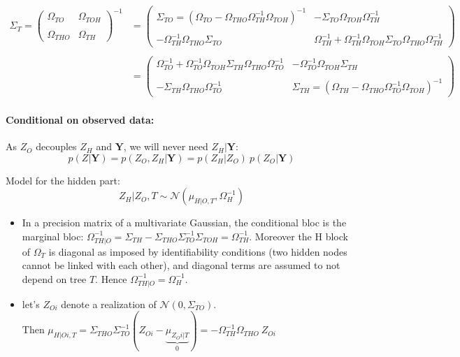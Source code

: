 \documentclass[11pt,a4paper]{article}
\newcommand{\Ybf}{\boldsymbol{Y}}
\begin{document}
\begin{align*}
 \Sigma_T=
  \left( {\begin{array}{cc}
  \Omega_{TO} &  \Omega_{TOH}\\\\
  \Omega_{THO} & \Omega_{TH}
  \end{array} } \right)^{-1} &=
  \left( {\begin{array}{cc}
  \Sigma_{TO} =( \Omega_{TO} - \Omega_{THO}\Omega_{TH}^{-1}\Omega_{TOH})^{-1} &  - \Sigma_{TO} \Omega_{TOH}\Omega_{TH}^{-1}\\\\
 -\Omega_{TH}^{-1}\Omega_{THO}\Sigma_{TO} & \Omega_{TH}^{-1}+\Omega_{TH}^{-1}\Omega_{TOH}\Sigma_{TO}\Omega_{THO}\Omega_{TH}^{-1}
  \end{array} } \right)\\\\
  &=   \left( {\begin{array}{cc}
   \Omega_{TO}^{-1}+\Omega_{TO}^{-1}\Omega_{TOH}\Sigma_{TH}\Omega_{THO}\Omega_{TO}^{-1} & -\Omega_{TO}^{-1}\Omega_{TOH}\Sigma_{TH} \\\\
    -\Sigma_{TH}\Omega_{THO}\Omega_{TO}^{-1}&  \Sigma_{TH}= (\Omega_{TH} - \Omega_{THO}\Omega_{TO}^{-1}\Omega_{TOH})^{-1} 
   \end{array} } \right)
\end{align*}
  


\paragraph{Conditional on observed data:\\}


As $Z_O$ decouples $Z_H$ and $\Ybf$, we will never need $Z_H|\Ybf$:
$$ p(Z|\Ybf) = p(Z_O,Z_H | \Ybf) = p(Z_H|Z_O) \: p(Z_O|\Ybf) $$



Model for the hidden part: $$Z_H|Z_O,T \sim \mathcal{N}(\mu_{H|O,T}, \Omega_{H}^{-1})$$ 

\begin{itemize}
\item In a precision matrix of a multivariate Gaussian, the conditional bloc is the marginal bloc:  $\Omega_{TH|O}^{-1} = \Sigma_{TH} -\Sigma_{THO}\Sigma_{TO}^{-1}\Sigma_{TOH} = \Omega_{TH}^{-1}$. Moreover the H block of $\Omega_T$ is diagonal as imposed by identifiability conditions (two hidden nodes cannot be linked with each other), and diagonal terms are assumed to not depend on tree $T$. Hence $\Omega_{TH|O}^{-1}=\Omega_{H}^{-1}$.

\item let's $Z_{Oi}$ denote a realization of $\mathcal{N}(0,\Sigma_{TO}) $.\\
 Then $\displaystyle  \mu_{H|Oi,T} = \Sigma_{THO}\Sigma_{TO}^{-1}(Z_{Oi}-\underbrace{\mu_{Z_Oi|T}}_{0}) 
 = -\Omega_{TH}^{-1}\Omega_{THO} \: Z_{Oi}
$\\
\end{itemize}
\end{document}
